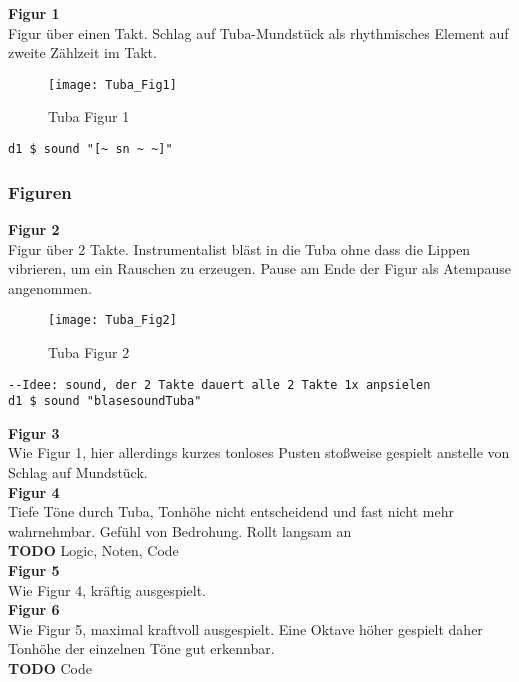 \documentclass[
10pt, %
a4paper, %
oneside, %
headinclude,footinclude, %
BCOR5mm, %
]{scrartcl}
\begin{document}
\noindent\textbf{Figur 1}\\
Figur über einen Takt. Schlag auf Tuba-Mundstück als rhythmisches Element auf zweite Zählzeit im Takt.\\
\begin{figure}[h]
	\centering 
	\texttt{[image: Tuba\_Fig1]} 
	\caption{Tuba Figur 1}
\end{figure}

\begin{lstlisting}
d1 $ sound "[~ sn ~ ~]"
\end{lstlisting}

\subsubsection{Figuren}
\textbf{Figur 2}\\
Figur über 2 Takte. Instrumentalist bläst in die Tuba ohne dass die Lippen vibrieren, um ein Rauschen zu erzeugen. Pause am Ende der Figur als Atempause angenommen. 

\begin{figure}[h]
	\centering 
	\texttt{[image: Tuba\_Fig2]} 
	\caption{Tuba Figur 2}
\end{figure}

\begin{lstlisting}
--Idee: sound, der 2 Takte dauert alle 2 Takte 1x anpsielen
d1 $ sound "blasesoundTuba"
\end{lstlisting}

\noindent\textbf{Figur 3}\\
Wie Figur 1, hier allerdings kurzes tonloses Pusten stoßweise gespielt anstelle von Schlag auf Mundstück.\\

\noindent\textbf{Figur 4}\\
Tiefe Töne durch Tuba, Tonhöhe nicht entscheidend und fast nicht mehr wahrnehmbar. Gefühl von Bedrohung. Rollt langsam an\\
{\color{red}\textbf{TODO}} Logic, Noten, Code\\

\noindent\textbf{Figur 5}\\
Wie Figur 4, kräftig ausgespielt.\\

\noindent\textbf{Figur 6}\\
Wie Figur 5, maximal kraftvoll ausgespielt. Eine Oktave höher gespielt daher Tonhöhe der einzelnen Töne gut erkennbar.\\
{\color{red}\textbf{TODO}} Code
\end{document}
